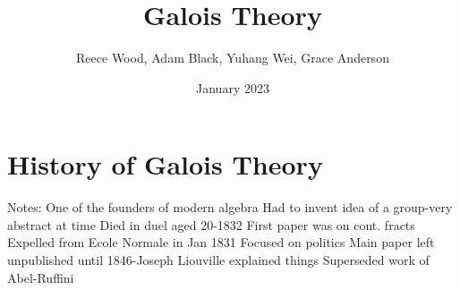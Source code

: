 \documentclass[12pt]{article}
\title{\textbf{Galois Theory}}
\author{Reece Wood, Adam Black, Yuhang Wei, Grace Anderson}
\date{January 2023}
\theoremstyle{definition}
\begin{document}
\maketitle

\tableofcontents

\newpage











\section{History of Galois Theory}

Notes:
One of the founders of modern algebra
Had to invent idea of a group-very abstract at time
Died in duel aged 20-1832
First paper was on cont. fracts
Expelled from Ecole Normale in Jan 1831
Focused on politics
Main paper left unpublished until 1846-Joseph Liouville explained things
Superseded work of Abel-Ruffini

\newpage
\appendix



\newpage

\end{document}
